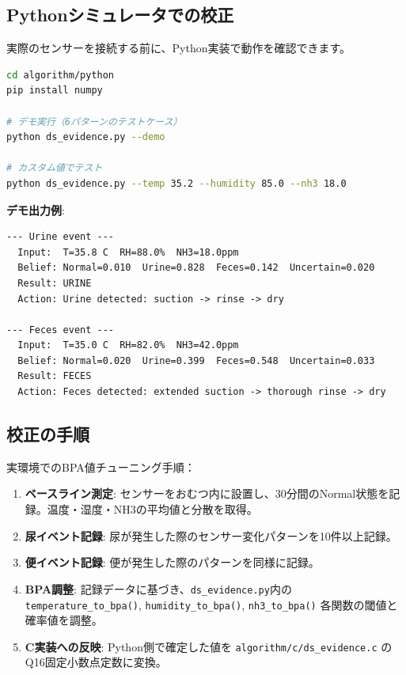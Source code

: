 \documentclass[a4paper,11pt]{article}
\begin{document}
\subsection{Pythonシミュレータでの校正}

実際のセンサーを接続する前に、Python実装で動作を確認できます。

\begin{lstlisting}[language=bash]
cd algorithm/python
pip install numpy

# デモ実行（6パターンのテストケース）
python ds_evidence.py --demo

# カスタム値でテスト
python ds_evidence.py --temp 35.2 --humidity 85.0 --nh3 18.0
\end{lstlisting}

\textbf{デモ出力例}:

\begin{lstlisting}
--- Urine event ---
  Input:  T=35.8 C  RH=88.0%  NH3=18.0ppm
  Belief: Normal=0.010  Urine=0.828  Feces=0.142  Uncertain=0.020
  Result: URINE
  Action: Urine detected: suction -> rinse -> dry

--- Feces event ---
  Input:  T=35.0 C  RH=82.0%  NH3=42.0ppm
  Belief: Normal=0.020  Urine=0.399  Feces=0.548  Uncertain=0.033
  Result: FECES
  Action: Feces detected: extended suction -> thorough rinse -> dry
\end{lstlisting}

\subsection{校正の手順}

実環境でのBPA値チューニング手順：

\begin{enumerate}[leftmargin=2em]
  \item \textbf{ベースライン測定}: センサーをおむつ内に設置し、30分間のNormal状態を記録。温度・湿度・NH3の平均値と分散を取得。
  \item \textbf{尿イベント記録}: 尿が発生した際のセンサー変化パターンを10件以上記録。
  \item \textbf{便イベント記録}: 便が発生した際のパターンを同様に記録。
  \item \textbf{BPA調整}: 記録データに基づき、\texttt{ds\_evidence.py}内の \texttt{temperature\_to\_bpa()}, \texttt{humidity\_to\_bpa()}, \texttt{nh3\_to\_bpa()} 各関数の閾値と確率値を調整。
  \item \textbf{C実装への反映}: Python側で確定した値を \texttt{algorithm/c/ds\_evidence.c} のQ16固定小数点定数に変換。
\end{enumerate}
\end{document}
